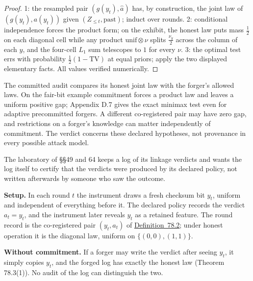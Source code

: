 \begin{proof}

1: the resampled pair \((g(y_t), \hat a)\) has, by construction, the joint law of \((g(y_t), a(y_t))\) given \((Z_{\le t}, \text{past})\); induct over rounds. 2: conditional independence forces the product form; on the exhibit, the honest law puts mass \(\tfrac12\) on each diagonal cell while any product \(\mathrm{unif} \otimes \nu\) splits \(\tfrac{\nu_y}{2}\) across the column of each \(y\), and the four-cell \(L_1\) sum telescopes to \(1\) for every \(\nu\). 3: the optimal test errs with probability \(\tfrac12(1 - \mathrm{TV})\) at equal priors; apply the two displayed elementary facts. All values verified numerically.
\end{proof}

\begin{thmrem}

The committed audit compares its honest joint law with the forger's allowed laws. On the fair-bit example commitment forces a product law and leaves a uniform positive gap; Appendix D.7 gives the exact minimax test even for adaptive precommitted forgers. A different co-registered pair may have zero gap, and restrictions on a forger's knowledge can matter independently of commitment. The verdict concerns these declared hypotheses, not provenance in every possible attack model.
\end{thmrem}


The laboratory of §§49 and 64 keeps a log of its linkage verdicts and wants the log itself to certify that the verdicts were produced by its declared policy, not written afterwards by someone who saw the outcome.

\textbf{Setup.} In each round \(t\) the instrument draws a fresh checksum bit \(y_t\), uniform and independent of everything before it. The declared policy records the verdict \(a_t = y_t\), and the instrument later reveals \(y_t\) as a retained feature. The round record is the co-registered pair \((y_t, a_t)\) of \hyperlink{stmt:78.2}{Definition~78.2}; under honest operation it is the diagonal law, uniform on \(\{(0,0),(1,1)\}\).

\textbf{Without commitment.} If a forger may write the verdict after seeing \(y_t\), it simply copies \(y_t\), and the forged log has exactly the honest law (Theorem 78.3(1)). No audit of the log can distinguish the two.

